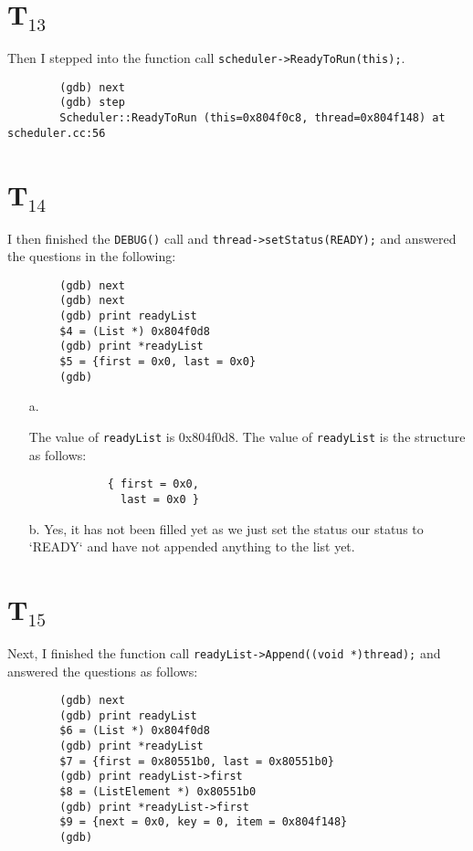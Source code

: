 \documentclass[letterpaper, 10pt]{article}
\begin{document}
	\section*{T$_{13}$}

	Then I stepped into the function call {\tt scheduler->ReadyToRun(this);}.

	\begin{verbatim}
		(gdb) next
		(gdb) step
		Scheduler::ReadyToRun (this=0x804f0c8, thread=0x804f148) at scheduler.cc:56
	\end{verbatim}

	\section*{T$_{14}$}

	I then finished the {\tt DEBUG()} call and {\tt thread->setStatus(READY);} and answered the questions in the following:

	\begin{verbatim}
		(gdb) next
		(gdb) next
		(gdb) print readyList
		$4 = (List *) 0x804f0d8
		(gdb) print *readyList
		$5 = {first = 0x0, last = 0x0}
		(gdb)
	\end{verbatim}

	\begin{itemize}
		\item[a.]{The value of {\tt readyList} is 0x804f0d8. The value of {\tt *readyList} is the structure as follows:
		\begin{verbatim}
			{ first = 0x0,
			  last = 0x0 }
		\end{verbatim}}
		\item[b.]{Yes, it has not been filled yet as we just set the status our status to `READY` and have not appended anything to the list yet.}
	\end{itemize}

	\section*{T$_{15}$}

	Next, I finished the function call {\tt readyList->Append((void *)thread);} and answered the questions as follows:

	\begin{verbatim}
		(gdb) next
		(gdb) print readyList
		$6 = (List *) 0x804f0d8
		(gdb) print *readyList
		$7 = {first = 0x80551b0, last = 0x80551b0}
		(gdb) print readyList->first
		$8 = (ListElement *) 0x80551b0
		(gdb) print *readyList->first
		$9 = {next = 0x0, key = 0, item = 0x804f148}
		(gdb)
	\end{verbatim}
\end{document}
